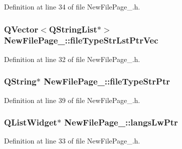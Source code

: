 Definition at line 34 of file New\-File\-Page\-\_.\-h.

\hypertarget{class_new_file_page__1_a5c348b3e762867bc02861bd317eb4964}{
\subsubsection[{file\-Type\-Str\-Lst\-Ptr\-Vec}]{\setlength{\rightskip}{0pt plus 5cm}Q\-Vector$<$Q\-String\-List$\ast$$>$ New\-File\-Page\-\_\-::file\-Type\-Str\-Lst\-Ptr\-Vec\hspace{0.3cm}{\ttfamily [private]}}}\label{class_new_file_page__1_a5c348b3e762867bc02861bd317eb4964}


Definition at line 32 of file New\-File\-Page\-\_.\-h.

\hypertarget{class_new_file_page__1_ac03bd12c5904b2a858137bf7bb93502c}{
\subsubsection[{file\-Type\-Str\-Ptr}]{\setlength{\rightskip}{0pt plus 5cm}Q\-String$\ast$ New\-File\-Page\-\_\-::file\-Type\-Str\-Ptr\hspace{0.3cm}{\ttfamily [private]}}}\label{class_new_file_page__1_ac03bd12c5904b2a858137bf7bb93502c}


Definition at line 39 of file New\-File\-Page\-\_.\-h.

\hypertarget{class_new_file_page__1_a33c1a3f115a92a04b0f7344cd1b14a57}{
\subsubsection[{langs\-Lw\-Ptr}]{\setlength{\rightskip}{0pt plus 5cm}Q\-List\-Widget$\ast$ New\-File\-Page\-\_\-::langs\-Lw\-Ptr\hspace{0.3cm}{\ttfamily [private]}}}\label{class_new_file_page__1_a33c1a3f115a92a04b0f7344cd1b14a57}


Definition at line 33 of file New\-File\-Page\-\_.\-h.

